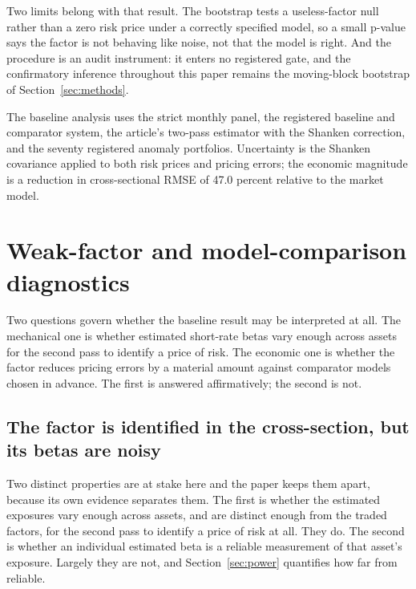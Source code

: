 \documentclass[11pt]{article}
\begin{document}
Two limits belong with that result. The bootstrap tests a useless-factor null
rather than a zero risk price under a correctly specified model, so a small
p-value says the factor is not behaving like noise, not that the model is right.
And the procedure is an audit instrument: it enters no registered gate, and the
confirmatory inference throughout this paper remains the moving-block bootstrap
of Section~\ref{sec:methods}. %

The baseline analysis uses the strict monthly panel, the registered baseline and
comparator system, the article's two-pass estimator with the Shanken correction,
and the seventy registered anomaly portfolios. Uncertainty is the Shanken
covariance applied to both risk prices and pricing errors; the economic magnitude
is a reduction in cross-sectional RMSE of 47.0 percent relative to the market %
model. %

\section{Weak-factor and model-comparison diagnostics}
\label{sec:diagnostics}

Two questions govern whether the baseline result may be interpreted at all. The
mechanical one is whether estimated short-rate betas vary enough across assets
for the second pass to identify a price of risk. The economic one is whether the
factor reduces pricing errors by a material amount against comparator models
chosen in advance. The first is answered affirmatively; the second is not.

\subsection{The factor is identified in the cross-section, but its betas are noisy}
\label{sec:identification}

Two distinct properties are at stake here and the paper keeps them apart, because
its own evidence separates them. The first is whether the estimated exposures
vary enough across assets, and are distinct enough from the traded factors, for
the second pass to identify a price of risk at all. They do. The second is
whether an individual estimated beta is a reliable measurement of that asset's
exposure. Largely they are not, and Section~\ref{sec:power} quantifies how far
from reliable.
\end{document}
